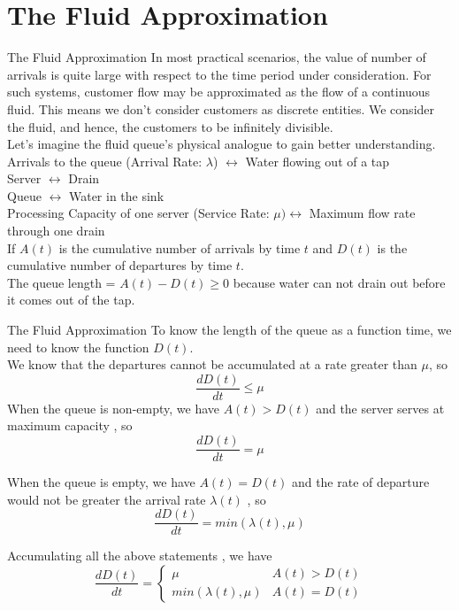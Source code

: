 \documentclass[9pt]{beamer}
\begin{document}
\section{The Fluid Approximation}
\begin{frame}{The Fluid Approximation}
In most practical scenarios, the value of number of arrivals is quite large with respect to the time period under consideration. For such systems, customer flow may be approximated as the flow of a continuous fluid. This means we don't consider customers as discrete entities. We consider the fluid, and hence, the customers to be infinitely divisible. \\ \bigskip
Let's imagine the fluid queue's physical analogue to gain better understanding. \\ 
Arrivals to the queue (Arrival Rate: $\lambda$) $\leftrightarrow$ Water flowing out of a tap \\
Server $\leftrightarrow$ Drain \\
Queue $\leftrightarrow$ Water in the sink \\
Processing Capacity of one server (Service Rate: $\mu) \leftrightarrow$ Maximum flow rate through one drain\\ \bigskip
If $A(t)$ is the cumulative number of arrivals by time $t$ and 
$D(t)$ is the cumulative number of departures by
time $t$. \\ 
The queue length = $A(t) - D(t) \geq 0$ because water can not drain out before it comes out of the tap. \\
\end{frame}

\begin{frame}{The Fluid Approximation}
To know the length of the queue as a function time, we need to know the function $D(t)$. \\ \bigskip
We know that the departures cannot be accumulated at a rate greater than $\mu$, so $$\frac{dD(t)}{dt} \leq \mu$$
 When the queue is non-empty, we have $A(t)>D(t)$ and the server serves at maximum capacity , so \[\frac{dD(t)}{dt} = \mu\]

 When the queue is empty, we have $A(t)=D(t)$ and the rate of departure would not be greater the arrival rate $\lambda(t)$ , so \[\frac{dD(t)}{dt} = min(\lambda(t),\mu)\]
 
 Accumulating all the above statements , we have
 \[
 \frac{dD(t)}{dt} =
   \begin{cases} 
      \mu & A(t)>D(t) \\
      min(\lambda(t),\mu) & A(t)=D(t)
   \end{cases}
  \]
\end{frame}
\end{document}
